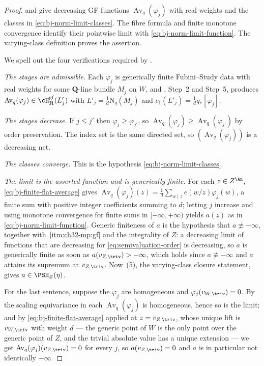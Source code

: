\begin{proof}
 and
 give decreasing GF functions
$\operatorname{Av}_q(\varphi_j)$ with real weights and the classes in
\eqref{eq:bj-norm-limit-classes}.  The fibre formula and finite monotone
convergence identify their pointwise limit with
\eqref{eq:bj-norm-limit-function}.  The varying-class definition
 proves the assertion.

We spell out the four verifications required by .

\emph{The stages are admissible.}  Each $\varphi_j$ is
generically finite Fubini--Study data with real weights for some $\mathbf Q$-line bundle
$M_j$ on $W$, and , Step~2 and
Step~5, produces
$\operatorname{Av}_q(\varphi_j)\in\cH^{\mathrm{gf}}_{\mathbf R}(L'_j)$
with $L'_j=\frac1d\mathrm N_q(M_j)$ and
$c_1(L'_j)=\frac1dq_*[\varphi_j]$.

\emph{The stages decrease.}  If $j\le j'$ then
$\varphi_j\ge\varphi_{j'}$, so
$\operatorname{Av}_q(\varphi_j)\ge\operatorname{Av}_q(\varphi_{j'})$ by
order preservation.  The index set is the same directed set, so
$(\operatorname{Av}_q(\varphi_j))$ is a decreasing net.

\emph{The classes converge.}  This is the hypothesis
\eqref{eq:bj-norm-limit-classes}.

\emph{The limit is the asserted function and is generically finite.}
For each $z\in Z^{\An}$, \eqref{eq:bj-finite-flat-average} gives
$\operatorname{Av}_q(\varphi_j)(z)=\frac1d\sum_{w\mid z}e(w/z)\varphi_j(w)$,
a finite sum with positive integer coefficients summing to $d$; letting
$j$ increase and using monotone convergence for finite sums in
$[-\infty,+\infty)$ yields $a(z)$ as in
\eqref{eq:bj-norm-limit-function}.  Generic finiteness of $a$ is the
hypothesis that $a\not\equiv-\infty$, together with
\,\cref{itm:ch32-mp:gf} and the
integrality of $Z$: a decreasing limit of functions that are decreasing
for \eqref{eq:semivaluation-order} is decreasing, so $a$ is
generically finite as soon as $a(v_{Z,\triv})>-\infty$, which holds since
$a\not\equiv-\infty$ and $a$ attains its supremum at
$v_{Z,\triv}$.  Now \,(5), the varying-class
closure statement, gives $a\in\PSH_Z(\eta)$.

For the last sentence, suppose the $\varphi_j$ are homogeneous and
$\varphi_j(v_{W,\triv})=0$.  By the scaling equivariance in
 each
$\operatorname{Av}_q(\varphi_j)$ is homogeneous, hence so is the limit;
and by \eqref{eq:bj-finite-flat-average} applied at $z=v_{Z,\triv}$,
whose unique lift is $v_{W,\triv}$ with weight $d$ --- the generic
point of $W$ is the only point over the generic point of $Z$, and the
trivial absolute value has a unique extension --- we get
$\operatorname{Av}_q(\varphi_j)(v_{Z,\triv})=0$ for every $j$, so
$a(v_{Z,\triv})=0$ and $a$ is in particular not identically
$-\infty$.
\end{proof}

